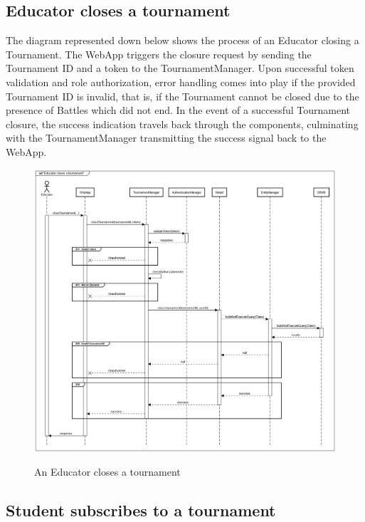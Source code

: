 \documentclass{Configuration_Files/Template}
\begin{document}
\subsection{Educator closes a tournament }

The diagram represented down below shows the process of an Educator closing a Tournament. The WebApp triggers the closure request by sending the Tournament ID and a token to the TournamentManager. Upon successful token validation and role authorization, error handling comes into play if the provided Tournament ID is invalid, that is, if the Tournament cannot be closed due to the presence of Battles which did not end. In the event of a successful Tournament closure, the success indication travels back through the components, culminating with the TournamentManager transmitting the success signal back to the WebApp. 

\begin{figure}[H]
\centering
\includegraphics[scale = 0.33]{Images/diagrams/sequences/closeTournament.png}\\
\caption{An Educator closes a tournament }
\end{figure}

\subsection{Student subscribes to a tournament }
\end{document}
